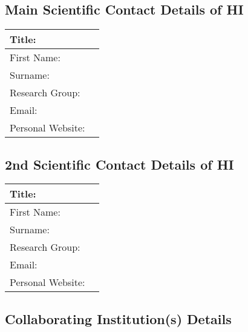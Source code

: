 \subsection{Main Scientific Contact Details of HI}

\begin{center}
    \small
    \begin{tabular}{|l|l|}
        \hline
        Title:       & \\\hline
        First Name:  & \\\hline
        Surname:     & \\\hline
        Research Group: &   \\\hline
        Email:       & \url{}\\\hline
        Personal Website: &

        \\\hline
    \end{tabular}
\end{center}


\subsection{2nd Scientific Contact Details of HI}

\begin{center}
    \small
    \begin{tabular}{|l|l|}
        \hline
        Title:       & \\\hline
        First Name:  & \\\hline
        Surname:     & \\\hline
        Research Group: &   \\\hline
        Email:       & \url{}\\\hline
        Personal Website: &

        \\\hline
    \end{tabular}
\end{center}


\subsection{Collaborating Institution(s) Details}

